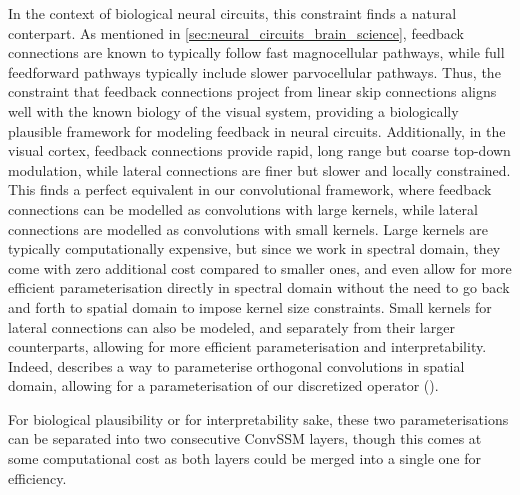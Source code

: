 In the context of biological neural circuits, this constraint finds a natural conterpart. As mentioned in \cref{sec:neural_circuits_brain_science}, feedback connections are known to typically follow fast magnocellular pathways, while full feedforward pathways typically include slower parvocellular pathways. Thus, the constraint that feedback connections project from linear skip connections aligns well with the known biology of the visual system, providing a biologically plausible framework for modeling feedback in neural circuits.  Additionally, in the visual cortex, feedback connections provide rapid, long range but coarse top-down modulation, while lateral connections are finer but slower and locally constrained. This finds a perfect equivalent in our convolutional framework, where feedback connections can be modelled as convolutions with large kernels, while lateral connections are modelled as convolutions with small kernels. Large kernels are typically computationally expensive, but since we work in spectral domain, they come with zero additional cost compared to smaller ones, and even allow for more efficient parameterisation directly in spectral domain without the need to go back and forth to spatial domain to impose kernel size constraints. Small kernels for lateral connections can also be modeled, and separately from their larger counterparts, allowing for more efficient parameterisation and interpretability. Indeed, \citet{TODO} describes a way to parameterise orthogonal convolutions in spatial domain, allowing for a parameterisation of our discretized operator (). 

For biological plausibility or for interpretability sake, these two parameterisations can be separated into two consecutive ConvSSM layers, though this comes at some computational cost as both layers could be merged into a single one for efficiency. 
